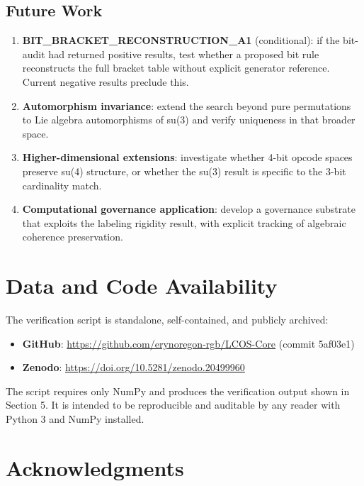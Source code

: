 \documentclass[11pt,a4paper]{article}
\begin{document}
\subsection{Future Work}

\begin{enumerate}
  \item \textbf{BIT\_BRACKET\_RECONSTRUCTION\_A1} (conditional): if the bit-audit had returned positive results, test whether a proposed bit rule reconstructs the full bracket table without explicit generator reference. Current negative results preclude this.

  \item \textbf{Automorphism invariance}: extend the search beyond pure permutations to Lie algebra automorphisms of su(3) and verify uniqueness in that broader space.

  \item \textbf{Higher-dimensional extensions}: investigate whether 4-bit opcode spaces preserve su(4) structure, or whether the su(3) result is specific to the 3-bit cardinality match.

  \item \textbf{Computational governance application}: develop a governance substrate that exploits the labeling rigidity result, with explicit tracking of algebraic coherence preservation.
\end{enumerate}

\section*{Data and Code Availability}

The verification script is standalone, self-contained, and publicly archived:
\begin{itemize}
  \item \textbf{GitHub}: \url{https://github.com/erynoregon-rgb/LCOS-Core} (commit 5af03e1)
  \item \textbf{Zenodo}: \url{https://doi.org/10.5281/zenodo.20499960}
\end{itemize}

The script requires only NumPy and produces the verification output shown in Section 5. It is intended to be reproducible and auditable by any reader with Python 3 and NumPy installed.

\section{Acknowledgments}
\end{document}
